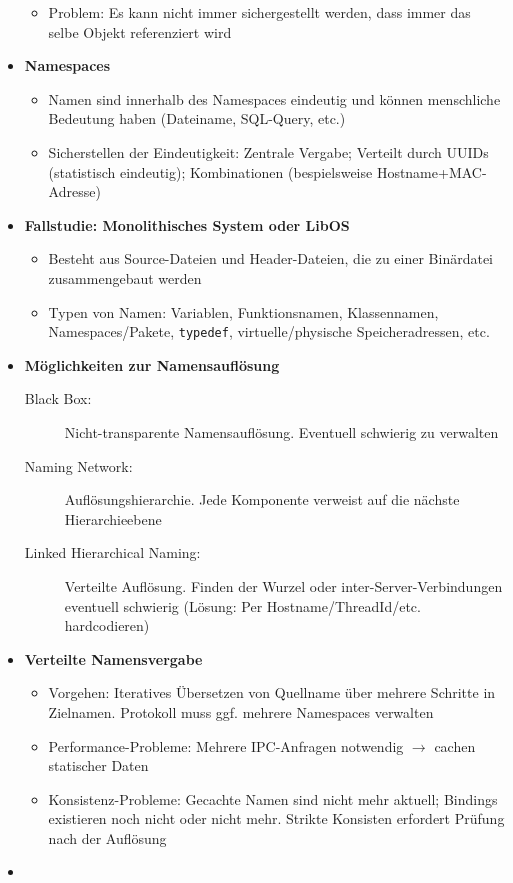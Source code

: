 \begin{itemize}
\begin{itemize}
		\item Problem: Es kann nicht immer sichergestellt werden, dass immer das selbe Objekt referenziert wird
	\end{itemize}
	\item \textbf{Namespaces}
	\begin{itemize}
		\item Namen sind innerhalb des Namespaces eindeutig und können menschliche Bedeutung haben (Dateiname, SQL-Query, etc.)
		\item Sicherstellen der Eindeutigkeit: Zentrale Vergabe; Verteilt durch UUIDs (statistisch eindeutig); Kombinationen (bespielsweise Hostname+MAC-Adresse)
	\end{itemize}
	\item \textbf{Fallstudie: Monolithisches System oder LibOS}
	\begin{itemize}
		\item Besteht aus Source-Dateien und Header-Dateien, die zu einer Binärdatei zusammengebaut werden
		\item Typen von Namen: Variablen, Funktionsnamen, Klassennamen, Namespaces/Pakete, \texttt{typedef}, virtuelle/physische Speicheradressen, etc.
	\end{itemize}
	\item \textbf{Möglichkeiten zur Namensauflösung}
	\begin{description}
		\item[Black Box:] Nicht-transparente Namensauflösung. Eventuell schwierig zu verwalten
		\item[Naming Network:] Auflösungshierarchie. Jede Komponente verweist auf die nächste Hierarchieebene
		\item[Linked Hierarchical Naming:] Verteilte Auflösung. Finden der Wurzel oder inter-Server-Verbindungen eventuell schwierig (Lösung: Per Hostname/ThreadId/etc. hardcodieren)
	\end{description}
	\item \textbf{Verteilte Namensvergabe}
	\begin{itemize}
		\item Vorgehen: Iteratives Übersetzen von Quellname über mehrere Schritte in Zielnamen. Protokoll muss ggf. mehrere Namespaces verwalten
		\item Performance-Probleme: Mehrere IPC-Anfragen notwendig \(\rightarrow\) cachen statischer Daten
		\item Konsistenz-Probleme: Gecachte Namen sind nicht mehr aktuell; Bindings existieren noch nicht oder nicht mehr. Strikte Konsisten erfordert Prüfung nach der Auflösung
	\end{itemize}
	\item %
\end{itemize}



